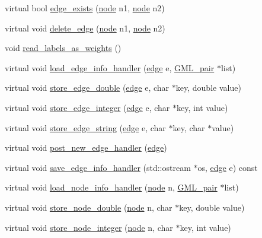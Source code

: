 \begin{DoxyCompactItemize}
\item 
virtual bool \mbox{\hyperlink{class_my_graph_a67910a9535e93bc6dcf53e961760b6da}{edge\+\_\+exists}} (\mbox{\hyperlink{classnode}{node}} n1, \mbox{\hyperlink{classnode}{node}} n2)
\item 
virtual void \mbox{\hyperlink{class_my_graph_a4070383c56ef8f54e9fdc595d65b89de}{delete\+\_\+edge}} (\mbox{\hyperlink{classnode}{node}} n1, \mbox{\hyperlink{classnode}{node}} n2)
\item 
void \mbox{\hyperlink{class_my_graph_a5d90ef0fba45bbbdf53a3bfe6f9a7061}{read\+\_\+labels\+\_\+as\+\_\+weights}} ()
\item 
virtual void \mbox{\hyperlink{class_my_graph_aae6f9d1beab66851272f9064e2058064}{load\+\_\+edge\+\_\+info\+\_\+handler}} (\mbox{\hyperlink{classedge}{edge}} e, \mbox{\hyperlink{struct_g_m_l__pair}{G\+M\+L\+\_\+pair}} $\ast$list)
\item 
virtual void \mbox{\hyperlink{class_my_graph_a5814b5aa19c45ba8cf5004c8b9ae3667}{store\+\_\+edge\+\_\+double}} (\mbox{\hyperlink{classedge}{edge}} e, char $\ast$key, double value)
\item 
virtual void \mbox{\hyperlink{class_my_graph_a116ec287755233fe20469b6df4062ccc}{store\+\_\+edge\+\_\+integer}} (\mbox{\hyperlink{classedge}{edge}} e, char $\ast$key, int value)
\item 
virtual void \mbox{\hyperlink{class_my_graph_a3f10b4d50b97fc6f33a767e9db7fdd8b}{store\+\_\+edge\+\_\+string}} (\mbox{\hyperlink{classedge}{edge}} e, char $\ast$key, char $\ast$value)
\item 
virtual void \mbox{\hyperlink{class_my_graph_a7d8f03bae7c6a731718385ae4e546d98}{post\+\_\+new\+\_\+edge\+\_\+handler}} (\mbox{\hyperlink{classedge}{edge}})
\item 
virtual void \mbox{\hyperlink{class_my_graph_aa2c8ff76d5443d4788ecfebc8f799182}{save\+\_\+edge\+\_\+info\+\_\+handler}} (std\+::ostream $\ast$os, \mbox{\hyperlink{classedge}{edge}} e) const
\item 
virtual void \mbox{\hyperlink{class_my_graph_acef355f66e5aeb19265a9860f2920381}{load\+\_\+node\+\_\+info\+\_\+handler}} (\mbox{\hyperlink{classnode}{node}} n, \mbox{\hyperlink{struct_g_m_l__pair}{G\+M\+L\+\_\+pair}} $\ast$list)
\item 
virtual void \mbox{\hyperlink{class_my_graph_a16b037dbb0011fc50367145c477ac7a4}{store\+\_\+node\+\_\+double}} (\mbox{\hyperlink{classnode}{node}} n, char $\ast$key, double value)
\item 
virtual void \mbox{\hyperlink{class_my_graph_a4f5922407f2f3fac566d1045d98da46f}{store\+\_\+node\+\_\+integer}} (\mbox{\hyperlink{classnode}{node}} n, char $\ast$key, int value)

\end{DoxyCompactItemize}
